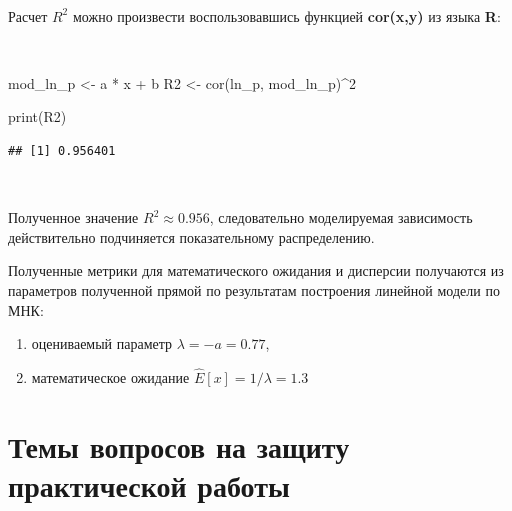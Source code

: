 \documentclass[
  14,
]{article}
\newenvironment{Shaded}{\begin{snugshade}}{\end{snugshade}}
\newcommand{\DecValTok}[1]{\textcolor[rgb]{0.00,0.00,0.81}{#1}}
\newcommand{\FunctionTok}[1]{\textcolor[rgb]{0.00,0.00,0.00}{#1}}
\newcommand{\NormalTok}[1]{#1}
\newcommand{\OtherTok}[1]{\textcolor[rgb]{0.56,0.35,0.01}{#1}}
\newcommand{\SpecialCharTok}[1]{\textcolor[rgb]{0.00,0.00,0.00}{#1}}
\begin{document}
\(\ \)

Расчет \(R^2\) можно произвести воспользовавшись функцией
\textbf{cor(x,y)} из языка \textbf{R}:

\(\ \)

\begin{Shaded}
\begin{Highlighting}[]
\NormalTok{mod\_ln\_p }\OtherTok{\textless{}{-}}\NormalTok{ a }\SpecialCharTok{*}\NormalTok{ x }\SpecialCharTok{+}\NormalTok{ b}
\NormalTok{R2 }\OtherTok{\textless{}{-}} \FunctionTok{cor}\NormalTok{(ln\_p, mod\_ln\_p)}\SpecialCharTok{\^{}}\DecValTok{2}

\FunctionTok{print}\NormalTok{(R2)}
\end{Highlighting}
\end{Shaded}

\begin{verbatim}
## [1] 0.956401
\end{verbatim}

\(\ \)

Полученное значение \(R^2 \approx 0.956\), следовательно моделируемая
зависимость действительно подчиняется показательному распределению.

Полученные метрики для математического ожидания и дисперсии получаются
из параметров полученной прямой по результатам построения линейной
модели по МНК:

\begin{enumerate}
\def\labelenumi{\arabic{enumi}.}
\item
  оцениваемый параметр \(\lambda = -a = 0.77\),
\item
  математическое ожидание \(\hat{E}[x] = 1/\lambda = 1.3\)
\end{enumerate}

\hypertarget{ux442ux435ux43cux44b-ux432ux43eux43fux440ux43eux441ux43eux432-ux43dux430-ux437ux430ux449ux438ux442ux443-ux43fux440ux430ux43aux442ux438ux447ux435ux441ux43aux43eux439-ux440ux430ux431ux43eux442ux44b}{%
\section{\texorpdfstring{\textbf{Темы вопросов на защиту практической
работы}}{Темы вопросов на защиту практической работы}}\label{ux442ux435ux43cux44b-ux432ux43eux43fux440ux43eux441ux43eux432-ux43dux430-ux437ux430ux449ux438ux442ux443-ux43fux440ux430ux43aux442ux438ux447ux435ux441ux43aux43eux439-ux440ux430ux431ux43eux442ux44b}}
\end{document}
